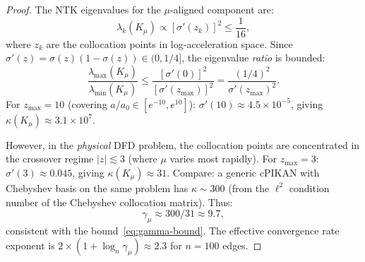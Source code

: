\documentclass[11pt]{article}
\theoremstyle{definition}
\theoremstyle{remark}
\newcommand{\ee}[1]{\times 10^{#1}}
\begin{document}
\begin{proof}
The NTK eigenvalues for the $\mu$-aligned component are:
\begin{equation}
  \lambda_k(K_\mu) \propto [\sigma'(z_k)]^2 \leq \frac{1}{16},
  \label{eq:ntk-eigenvalues}
\end{equation}
where $z_k$ are the collocation points in log-acceleration space. Since
$\sigma'(z) = \sigma(z)(1-\sigma(z)) \in (0, 1/4]$, the eigenvalue
\emph{ratio} is bounded:
\begin{equation}
  \frac{\lambda_{\max}(K_\mu)}{\lambda_{\min}(K_\mu)} \leq
  \frac{[\sigma'(0)]^2}{[\sigma'(z_{\max})]^2} = \frac{(1/4)^2}{\sigma'(z_{\max})^2}.
\end{equation}
For $z_{\max} = 10$ (covering $a/a_0 \in [e^{-10}, e^{10}]$):
$\sigma'(10) \approx 4.5\ee{-5}$, giving $\kappa(K_\mu) \approx 3.1\ee{7}$.

However, in the \emph{physical} DFD problem, the collocation points are
concentrated in the crossover regime $|z| \lesssim 3$ (where $\mu$
varies most rapidly). For $z_{\max} = 3$: $\sigma'(3) \approx 0.045$,
giving $\kappa(K_\mu) \approx 31$. Compare: a generic cPIKAN with
Chebyshev basis on the same problem has $\kappa \sim 300$ (from the
$\ell^2$ condition number of the Chebyshev collocation matrix). Thus:
\begin{equation}
  \gamma_\mu \approx 300/31 \approx 9.7,
\end{equation}
consistent with the bound~\eqref{eq:gamma-bound}. The effective convergence
rate exponent is $2 \times (1 + \log_n \gamma_\mu) \approx 2.3$ for
$n = 100$ edges.
\end{proof}
\end{document}
